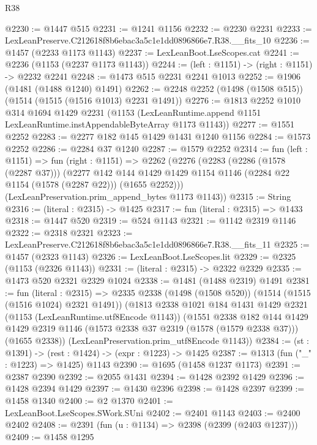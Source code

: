 \begin{lexlean}{R38}
\begin{coremodule}
@2230 := @1447 @515
@2231 := @1241 @1156
@2232 := @2230 @2231
@2233 := LexLeanPreserve.C212618f8b6ebac3a5c1e1dd0896866e7.R38.__fits_10
@2236 := @1457 (@2233 @1173 @1143)
@2237 := LexLeanBoot.LseScopes.cat
@2241 := @2236 (@1153 (@2237 @1173 @1143))
@2244 := (left : @1151) -> (right : @1151) -> @2232 @2241
@2248 := @1473 @515 @2231 @2241 @1013
@2252 := @1906 (@1481 (@1488 @1240) @1491)
@2262 := @2248 @2252 (@1498 (@1508 @515)) (@1514 (@1515 (@1516 @1013) @2231 @1491))
@2276 := @1813
    @2252
    @1010
    @314
    @1694
    @1429
    @2231
    (@1153 (LexLeanRuntime.append @1151 LexLeanRuntime.instAppendableByteArray @1173 @1143))
@2277 := @1551 @2252
@2283 := @2277 @182 @145 @1429 @1431 @1240 @1156
@2284 := @1573 @2252
@2286 := @2284 @37 @1240
@2287 := @1579 @2252
@2314 := fun (left : @1151) =>
  fun (right : @1151) =>
  @2262
    (@2276
      (@2283
        (@2286 (@1578 (@2287 @37)))
        (@2277
          @142
          @144
          @1429
          @1429
          @1154
          @1146
          (@2284 @22 @1154 (@1578 (@2287 @22)))
          (@1655 @2252)))
      (LexLeanPreservation.prim_append_bytes @1173 @1143))
@2315 := String
@2316 := (literal : @2315) -> @1425
@2317 := fun (literal : @2315) => @1433
@2318 := @1447 @520
@2319 := @524 @1143
@2321 := @1142 @2319 @1146
@2322 := @2318 @2321
@2323 := LexLeanPreserve.C212618f8b6ebac3a5c1e1dd0896866e7.R38.__fits_11
@2325 := @1457 (@2323 @1143)
@2326 := LexLeanBoot.LseScopes.lit
@2329 := @2325 (@1153 (@2326 @1143))
@2331 := (literal : @2315) -> @2322 @2329
@2335 := @1473 @520 @2321 @2329 @1024
@2338 := @1481 (@1488 @2319) @1491
@2381 := fun (literal : @2315) =>
  @2335
    @2338
    (@1498 (@1508 @520))
    (@1514 (@1515 (@1516 @1024) @2321 @1491))
    (@1813
      @2338
      @1021
      @184
      @1431
      @1429
      @2321
      (@1153 (LexLeanRuntime.utf8Encode @1143))
      (@1551
        @2338
        @182
        @144
        @1429
        @1429
        @2319
        @1146
        (@1573 @2338 @37 @2319 (@1578 (@1579 @2338 @37)))
        (@1655 @2338))
      (LexLeanPreservation.prim_utf8Encode @1143))
@2384 := (st : @1391) -> (rest : @1424) -> (expr : @1223) -> @1425
@2387 := @1313 (fun ("_" : @1223) => @1425) @1143
@2390 := @1695 (@1458 @1237 @1173)
@2391 := @2387 @2390
@2392 := @2055 @1431
@2394 := @1428 @2392 @1429
@2396 := @1428 @2394 @1429
@2397 := @1430 @2396
@2398 := @1428 @2397
@2399 := @1458 @1340
@2400 := @2 @1370
@2401 := LexLeanBoot.LseScopes.SWork.SUni
@2402 := @2401 @1143
@2403 := @2400 @2402
@2408 := @2391 (fun (u : @1134) => @2398 (@2399 (@2403 @1237)))
@2409 := @1458 @1295

\end{coremodule}
\end{lexlean}
